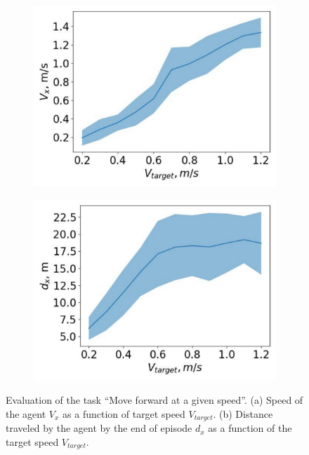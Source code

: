 \begin{figure}[h]
\begin{subfigure}{.5\textwidth}
  \centering
  \includegraphics[width=1\textwidth]{images/vx}
\end{subfigure}%
\begin{subfigure}{.5\textwidth}
  \centering
  \includegraphics[width=1\textwidth]{images/dx}
\end{subfigure}%
\caption{Evaluation of the task ``Move forward at a given speed''. (a) Speed of the agent $V_x$ as a function of target speed $V_{target}$. (b) Distance traveled by the agent by the end of episode $d_x$ as a function of the target speed $V_{target}$.}
\label{fig:unitree_eval_forward}
\end{figure}

